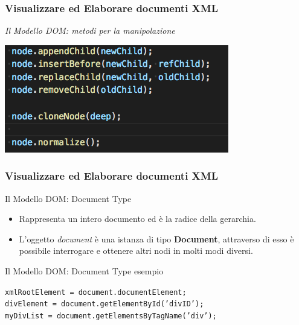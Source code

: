 \begin{frame}
    \frametitle{Visualizzare ed Elaborare documenti XML}
    \addtocounter{nframe}{1}
    

     \textit{Il Modello DOM: metodi per la manipolazione}
       
    \begin{center}
        \includegraphics[width=.9\textwidth]{imgs/nodeManipulation.png}
    \end{center}
     
\end{frame}



\begin{frame}
    \frametitle{Visualizzare ed Elaborare documenti XML}
    \addtocounter{nframe}{1}
    

     \begin{block}{Il Modello DOM: Document Type}
        \begin{itemize}
            \item Rappresenta un intero documento ed è la radice della gerarchia.
            \item L'oggetto \textit{document} è una istanza di tipo \textbf{Document}, attraverso di esso è possibile interrogare e ottenere altri nodi in molti modi diversi.
        \end{itemize}
     \end{block}

     \begin{block}{Il Modello DOM: Document Type esempio}

            \texttt{xmlRootElement = document.documentElement;}
            \\\texttt{divElement = document.getElementById('divID');}
            \\\texttt{myDivList = document.getElementsByTagName('div');}
       
     \end{block}

\end{frame}

